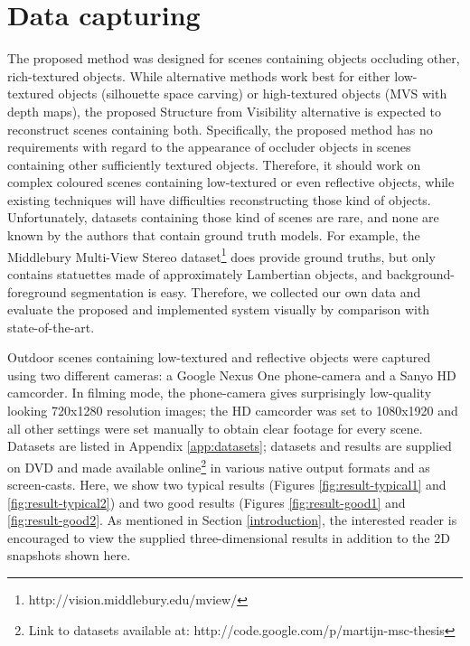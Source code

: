 
\section{Data capturing}
The proposed method was designed for scenes containing objects occluding other, rich-textured objects. While alternative methods work best for either low-textured objects (silhouette space carving) or high-textured objects (MVS with depth maps), the proposed Structure from Visibility alternative is expected to reconstruct scenes containing both. Specifically, the proposed method has no requirements with regard to the appearance of occluder objects in scenes containing other sufficiently textured objects. Therefore, it should work on complex coloured scenes containing low-textured or even reflective objects, while existing techniques will have difficulties reconstructing those kind of objects. Unfortunately, datasets containing those kind of scenes are rare, and none are known by the authors that contain ground truth models. For example, the Middlebury Multi-View Stereo dataset\footnote{http://vision.middlebury.edu/mview/} \cite{Seitz2006} does provide ground truths, but only contains statuettes made of approximately Lambertian objects, and background-foreground segmentation is easy. Therefore, we collected our own data and evaluate the proposed and implemented system visually by comparison with state-of-the-art.

Outdoor scenes containing low-textured and reflective objects were captured using two different cameras: a Google Nexus One phone-camera and a Sanyo HD camcorder. In filming mode, the phone-camera gives surprisingly low-quality looking 720x1280 resolution images; the HD camcorder was set to 1080x1920 and all other settings were set manually to obtain clear footage for every scene. Datasets are listed in Appendix \ref{app:datasets}; datasets and results are supplied on DVD and made available online\footnote{Link to datasets available at: http://code.google.com/p/martijn-msc-thesis} in various native output formats and as screen-casts. Here, we show two typical results (Figures \ref{fig:result-typical1} and \ref{fig:result-typical2}) and two good results (Figures \ref{fig:result-good1}  and \ref{fig:result-good2}. As mentioned in Section \ref{introduction}, the interested reader is encouraged to view the supplied three-dimensional results in addition to the 2D snapshots shown here.

